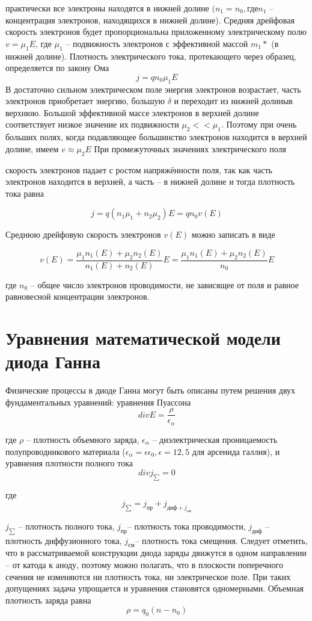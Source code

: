 \documentclass[a4paper, 12pt]{article}
\begin{document}
практически все электроны находятся в нижней долине $(n_1=n_0, \text{где} n_1$ –
концентрация электронов, находящихся в нижней долине).
Средняя дрейфовая скорость электронов будет пропорциональна
приложенному электрическому полю $v = \mu_1 E$, где $\mu_1$ – подвижность электронов с
эффективной массой $m_1*$ (в нижней долине). Плотность электрического тока,
протекающего через образец, определяется по закону Ома
\[j = qn_0\mu_1 E\]
В достаточно сильном электрическом поле энергия электронов возрастает,
часть электронов приобретает энергию, большую $\delta$ и переходит из нижней
долиныв верхнюю. Большой эффективной массе электронов в верхней долине
соответствует низкое значение их подвижности $\mu_2 << \mu_1$. Поэтому при очень
больших полях, когда подавляющее большинство электронов находится в верхней
долине, имеем $v \approx \mu_2 E$ При промежуточных значениях электрического поля

скорость электронов падает с ростом напряжённости поля, так как часть
электронов находится в верхней, а часть – в нижней долине и тогда плотность
тока равна

\[j = q(n_1\mu_1 + n_2\mu_2)E = qn_0v(E)\]


Среднюю дрейфовую скорость электронов $v(E)$ можно записать в виде

\[v(E) = \frac{\mu_1 n_1(E) + \mu_2 n_2(E)}{n_1(E) + n_2(E)}E = \frac{\mu_1 n_1(E) + \mu_2 n_2(E)}{n_0  }E\]

где $n_0$ – общее число электронов проводимости, не зависящее от поля
и равное равновесной концентрации электронов.

\section*{Уравнения математической модели диода Ганна}
Физические процессы в диоде Ганна могут быть описаны путем решения
двух фундаментальных уравнений: уравнения Пуассона
\[div{E} = \frac{\rho}{\epsilon_{\alpha}}\]

где $\rho$ – плотность объемного заряда, $\epsilon_{\alpha}$ – диэлектрическая проницаемость
полупроводникового материала ($\epsilon_{\alpha}= \epsilon \epsilon_0, \epsilon = 12,5$ для арсенида галлия), и
уравнения плотности полного тока
\[div{j_{\sum}} = 0\]

где
\[j_{\sum} = j_{\text{пр}} + j_{\text{диф} + j_{\text{см}}}\]

$j_{\sum}$ – плотность полного тока, $j_{\text{пр}}$– плотность тока проводимости, $j_{\text{диф}}$ – плотность
диффузионного тока, $j_{\text{см}}$– плотность тока смещения.
Следует отметить, что в рассматриваемой
конструкции диода заряды движутся в одном направлении – от катода к аноду,
поэтому можно полагать, что в плоскости поперечного сечения не изменяются ни
плотность тока, ни электрическое поле. При таких допущениях задача упрощается
и уравнения становятся одномерными.
Объемная плотность заряда равна
\[\rho = q_0(n - n_0)\]
\end{document}
